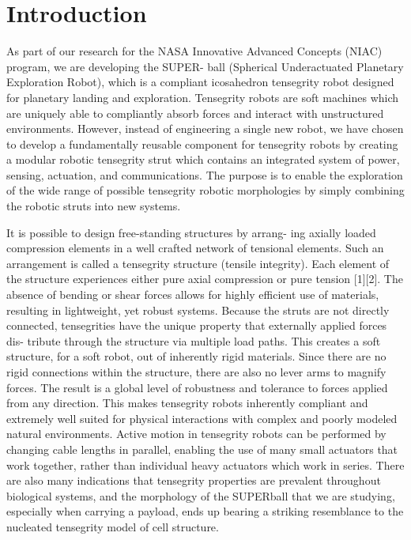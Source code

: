 \chapter{Introduction}

As part of our research for the NASA Innovative Advanced
Concepts  (NIAC)  program,  we  are  developing  the  SUPER-
ball (Spherical Underactuated Planetary Exploration Robot),
which is a compliant icosahedron tensegrity robot designed
for   planetary   landing   and   exploration.   Tensegrity   robots
are  soft  machines  which  are  uniquely  able  to  compliantly
absorb  forces  and  interact  with  unstructured  environments.
However, instead of engineering a single new robot, we have
chosen  to  develop  a  fundamentally  reusable  component  for
tensegrity  robots  by  creating  a  modular  robotic  tensegrity
strut which contains an integrated system of power, sensing,
actuation, and communications. The purpose is to enable the
exploration of the wide range of possible tensegrity robotic
morphologies  by  simply  combining  the  robotic  struts  into
new systems.

It is possible to design free-standing structures by arrang-
ing  axially  loaded  compression  elements  in  a  well  crafted
network of tensional elements. Such an arrangement is called
a tensegrity structure (tensile integrity). Each element of the
structure  experiences  either  pure  axial  compression  or  pure
tension [1][2]. The absence of bending or shear forces allows
for highly efficient use of materials, resulting in lightweight,
yet robust systems.
Because the struts are not directly connected, tensegrities
have  the  unique  property  that  externally  applied  forces  dis-
tribute  through  the  structure  via  multiple  load  paths.  This
creates  a  soft  structure,  for  a  soft  robot,  out  of  inherently
rigid  materials.  Since  there  are  no  rigid  connections  within
the structure, there are also no lever arms to magnify forces.
The  result  is  a  global  level  of  robustness  and  tolerance  to
forces applied from any direction.
This  makes  tensegrity  robots  inherently  compliant  and
extremely well suited for physical interactions with complex
and  poorly  modeled  natural  environments.  Active  motion
in  tensegrity  robots  can  be  performed  by  changing  cable
lengths in parallel, enabling the use of many small actuators
that  work  together,  rather  than  individual  heavy  actuators
which   work   in   series.   There   are   also   many   indications
that tensegrity properties are prevalent throughout biological
systems,  and  the  morphology  of  the  SUPERball  that  we
are  studying,  especially  when  carrying  a  payload,  ends  up
bearing  a  striking  resemblance  to  the  nucleated  tensegrity
model of cell structure.

